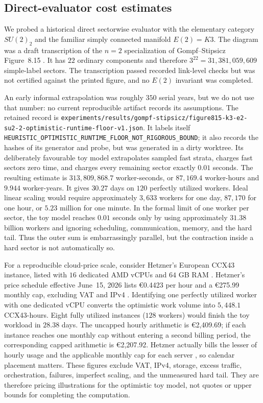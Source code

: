 \subsection{Direct-evaluator cost estimates}
\label{app:computational-cost}

We probed a historical direct sectorwise evaluator with the elementary
category $SU(2)_2$ and the familiar simply connected manifold $E(2)=K3$.
The diagram was a draft transcription of the $n=2$ specialization of
Gompf--Stipsicz Figure~8.15 \cite[Figure~8.15]{GompfStipsicz1999}.  It has $22$
ordinary components and therefore
$3^{22}=31{,}381{,}059{,}609$ simple-label sectors.  The transcription passed
recorded link-level checks but was not certified against the printed figure,
and no $E(2)$ invariant was completed.

An early informal extrapolation was roughly $350$ serial years, but we do not
use that number: no current reproducible artifact records its assumptions.
The retained record is
\nolinkurl{experiments/results/gompf-stipsicz/figure815-k3-e2-su2-2-optimistic-runtime-floor-v1.json}.
It labels itself
\texttt{HEURISTIC\_OPTIMISTIC\_RUNTIME\_FLOOR\_NOT\_RIGOROUS\_BOUND}; it also
records the hashes of its generator and probe, but was generated in a dirty
worktree.  Its deliberately favourable toy model extrapolates sampled fast
strata, charges fast sectors zero time, and charges every remaining sector
exactly $0.01$ seconds.  The resulting estimate is
$313{,}809{,}868.7$ worker-seconds, or $87{,}169.4$ worker-hours and
$9.944$ worker-years.  It gives $30.27$ days on $120$ perfectly utilized
workers.  Ideal linear scaling would require approximately $3{,}633$ workers
for one day, $87{,}170$ for one hour, or $5.23$ million for one minute.  In the
formal limit of one worker per sector, the toy model reaches $0.01$ seconds
only by using approximately $31.38$ billion workers and ignoring scheduling,
communication, memory, and the hard tail.  Thus the outer sum is embarrassingly
parallel, but the contraction inside a hard sector is not automatically so.

For a reproducible cloud-price scale, consider Hetzner's European CCX43
instance, listed with $16$ dedicated AMD vCPUs and $64$ GB RAM
\cite{HetznerCloudGeneralPurpose2026}.  Hetzner's price schedule effective
June~15, 2026 lists €0.4423 per hour and a €275.99 monthly cap, excluding VAT
and IPv4 \cite{HetznerCloudPricing2026}.  Identifying one perfectly utilized
worker with one dedicated vCPU converts the optimistic work volume into
$5{,}448.1$ CCX43-hours.  Eight fully utilized instances ($128$ workers) would
finish the toy workload in $28.38$ days.  The uncapped hourly arithmetic is
€2,409.69; if each instance reaches one monthly cap without entering a second
billing period, the corresponding capped arithmetic is €2,207.92.  Hetzner
actually bills the lesser of hourly usage and the applicable monthly cap for
each server \cite{HetznerCloudBilling2026}, so calendar placement matters.
These figures exclude VAT, IPv4, storage, excess traffic, orchestration,
failures, imperfect scaling, and the unmeasured hard tail.  They are therefore
pricing illustrations for the optimistic toy model, not quotes or upper bounds
for completing the computation.

